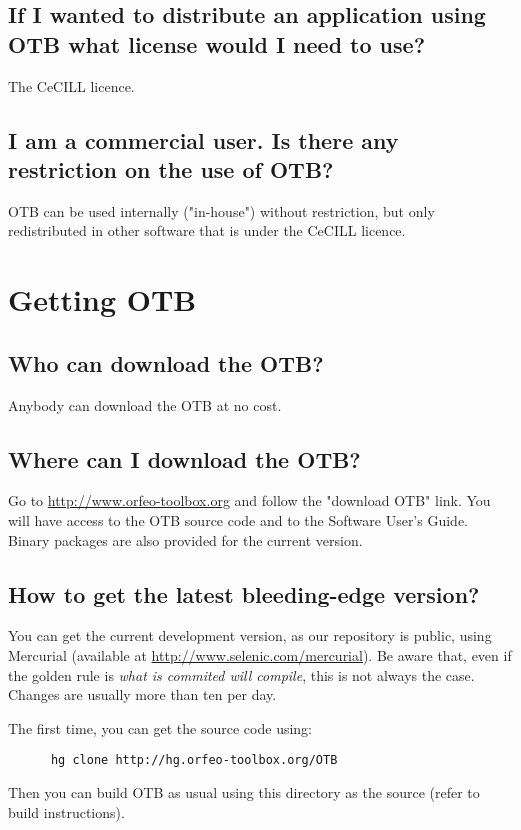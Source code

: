 \subsection{If I wanted to distribute an application using OTB what license would I need to use?}
    The CeCILL licence.

\subsection{I am a commercial user. Is there any restriction on the
  use of OTB?}
OTB can be used internally ("in-house") without restriction, but only
redistributed in other software that is under the CeCILL licence.

\section{Getting OTB}

\subsection{Who can download the OTB?}
Anybody can download the OTB at no cost.

\subsection{Where can I download the OTB?}
Go to \url{http://www.orfeo-toolbox.org}
 and follow the "download OTB" link. You will have access to the OTB
source code and to the Software User's Guide. Binary packages are also provided for the current version.

\subsection{How to get the latest bleeding-edge version?}\label{sec:FAQMercurial}

You can get the current development version, as our repository is public, using Mercurial (available at \url{http://www.selenic.com/mercurial}). Be aware that, even if the golden rule is {\em what is commited will compile}, this is not always the case. Changes are usually more than ten per day.

The first time, you can get the source code using:
\begin{verbatim}
      hg clone http://hg.orfeo-toolbox.org/OTB
\end{verbatim}

Then you can build OTB as usual using this directory as the source (refer to build instructions).

